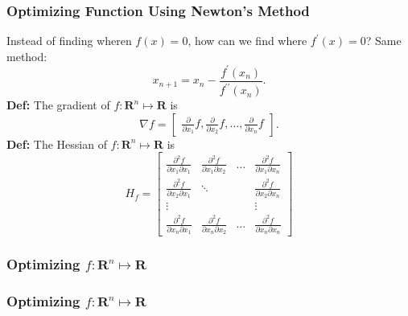 \documentclass{beamer}
\newcommand{\RR}{\mathbf{R}}
\newcommand{\m}[1]{\begin{bmatrix} #1 \end{bmatrix}}
\newcommand{\pp}[2]{\frac{\partial^2 f}{\partial #1 \partial #2}}
\begin{document}
\begin{frame}
    \frametitle{Optimizing Function Using Newton's Method}
    Instead of finding wheren $f(x)=0$, how 
    can we find where $f^\prime(x)=0$? Same
    method:
    \[
        x_{n+1} = x_n - \frac{f^\prime(x_n)}{f^{\prime\prime}(x_n)}.
    \]
    \textbf{Def:} The gradient of $f: \RR^n \mapsto \RR$ is
    \[
        \nabla f = \m{\frac{\partial}{\partial x_1}f, \frac{\partial}{\partial x_2}f, \dots, \frac{\partial}{\partial x_n}f}.
    \]
    \textbf{Def:} The Hessian of $f: \RR^n \mapsto \RR$ is
    \[
        H_f = \m{\pp{x_1}{x_1}&\pp{x_1}{x_2}&\dots&\pp{x_1}{x_n}\\
                 \pp{x_2}{x_1}&\ddots&&\pp{x_2}{x_n}\\
        \vdots&&&\vdots\\
                 \pp{x_n}{x_1}&\pp{x_n}{x_2}&\dots&\pp{x_n}{x_n}}
    \]
\end{frame}

\begin{frame}
    \frametitle{Optimizing $f : \RR^n \mapsto \RR$}
\end{frame}

\begin{frame}
    \frametitle{Optimizing $f : \RR^n \mapsto \RR$}
\end{frame}
\end{document}
